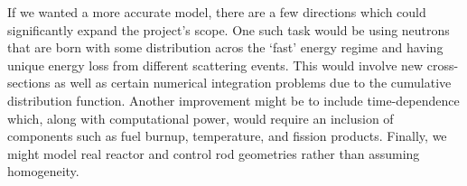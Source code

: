 \documentclass{notes}
\begin{document}
If we wanted a more accurate model, there are a few directions which could significantly expand the project's scope. One such task would be using neutrons that are born with some distribution acros the `fast' energy regime and having unique energy loss from different scattering events. This would involve new cross-sections as well as certain numerical integration problems due to the cumulative distribution function. Another improvement might be to include time-dependence which, along with computational power, would require an inclusion of components such as fuel burnup, temperature, and fission products. Finally, we might model real reactor and control rod geometries rather than assuming homogeneity.

\nocite{*}

\end{document}
